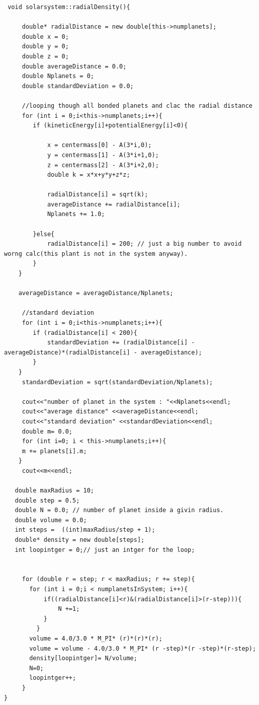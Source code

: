 \documentclass[10pt,a4paper]{article}
\begin{document}
 \begin{lstlisting}
 void solarsystem::radialDensity(){

     double* radialDistance = new double[this->numplanets];
     double x = 0;
     double y = 0;
     double z = 0;
     double averageDistance = 0.0;
     double Nplanets = 0;
     double standardDeviation = 0.0;

     //looping though all bonded planets and clac the radial distance
     for (int i = 0;i<this->numplanets;i++){
        if (kineticEnergy[i]+potentialEnergy[i]<0){

            x = centermass[0] - A(3*i,0);
            y = centermass[1] - A(3*i+1,0);
            z = centermass[2] - A(3*i+2,0);
            double k = x*x+y*y+z*z;

            radialDistance[i] = sqrt(k);
            averageDistance += radialDistance[i];
            Nplanets += 1.0;

        }else{
            radialDistance[i] = 200; // just a big number to avoid worng calc(this plant is not in the system anyway).
        }
    }

    averageDistance = averageDistance/Nplanets;

     //standard deviation
     for (int i = 0;i<this->numplanets;i++){
        if (radialDistance[i] < 200){
            standardDeviation += (radialDistance[i] - averageDistance)*(radialDistance[i] - averageDistance);
        }
    }
     standardDeviation = sqrt(standardDeviation/Nplanets);

     cout<<"number of planet in the system : "<<Nplanets<<endl;
     cout<<"average distance" <<averageDistance<<endl;
     cout<<"standard deviation" <<standardDeviation<<endl;
     double m= 0.0;
     for (int i=0; i < this->numplanets;i++){
     m += planets[i].m;
    }
     cout<<m<<endl;

   double maxRadius = 10;
   double step = 0.5;
   double N = 0.0; // number of planet inside a givin radius.
   double volume = 0.0;
   int steps =  ((int)maxRadius/step + 1);
   double* density = new double[steps];
   int loopintger = 0;// just an intger for the loop;


     for (double r = step; r < maxRadius; r += step){
       for (int i = 0;i < numplanetsInSystem; i++){
           if((radialDistance[i]<r)&(radialDistance[i]>(r-step))){
               N +=1;
           }
         }
       volume = 4.0/3.0 * M_PI* (r)*(r)*(r);
       volume = volume - 4.0/3.0 * M_PI* (r -step)*(r -step)*(r-step);
       density[loopintger]= N/volume;
       N=0;
       loopintger++;
     }
}
  \end{lstlisting}
\end{document}
